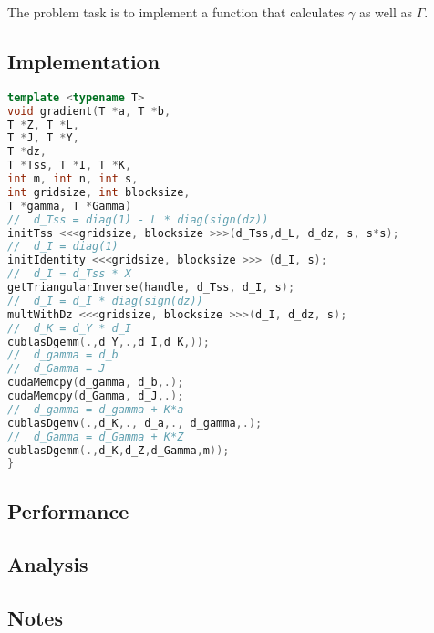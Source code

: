 The problem task is to implement a function that calculates $\gamma$ as well as $\Gamma$.

\subsection{Implementation}

\begin{lstlisting}[language=cpp]
template <typename T>
void gradient(T *a, T *b, 
T *Z, T *L, 
T *J, T *Y,
T *dz,
T *Tss, T *I, T *K,
int m, int n, int s,
int gridsize, int blocksize,
T *gamma, T *Gamma)
//  d_Tss = diag(1) - L * diag(sign(dz))
initTss <<<gridsize, blocksize >>>(d_Tss,d_L, d_dz, s, s*s);
//  d_I = diag(1)
initIdentity <<<gridsize, blocksize >>> (d_I, s);
//  d_I = d_Tss * X	
getTriangularInverse(handle, d_Tss, d_I, s);
//	d_I = d_I * diag(sign(dz))
multWithDz <<<gridsize, blocksize >>>(d_I, d_dz, s);
//	d_K = d_Y * d_I
cublasDgemm(.,d_Y,.,d_I,d_K,));
//	d_gamma = d_b
//  d_Gamma = J
cudaMemcpy(d_gamma, d_b,.);
cudaMemcpy(d_Gamma, d_J,.);
//	d_gamma = d_gamma + K*a
cublasDgemv(.,d_K,., d_a,., d_gamma,.);
//  d_Gamma = d_Gamma + K*Z
cublasDgemm(.,d_K,d_Z,d_Gamma,m));
}
\end{lstlisting}

\subsection{Performance}
\subsection{Analysis}
\subsection{Notes}